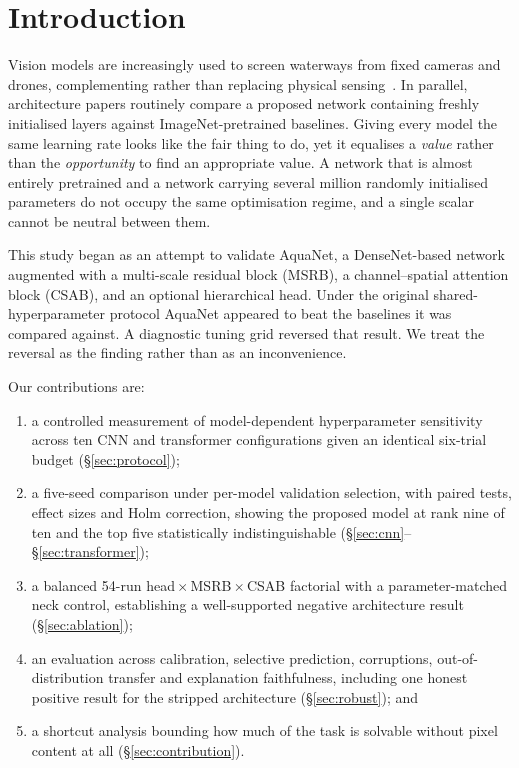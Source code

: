 \documentclass[10pt,journal]{IEEEtran}
\begin{document}
\section{Introduction}
Vision models are increasingly used to screen waterways from fixed cameras and drones,
complementing rather than replacing physical sensing~\cite{al2024drone,kim2023cctv}. In
parallel, architecture papers routinely compare a proposed network containing freshly
initialised layers against ImageNet-pretrained baselines. Giving every model the same
learning rate looks like the fair thing to do, yet it equalises a \emph{value} rather than
the \emph{opportunity} to find an appropriate value. A network that is almost entirely
pretrained and a network carrying several million randomly initialised parameters do not
occupy the same optimisation regime, and a single scalar cannot be neutral between them.

This study began as an attempt to validate AquaNet, a DenseNet-based network augmented with
a multi-scale residual block (MSRB), a channel--spatial attention block (CSAB), and an
optional hierarchical head. Under the original shared-hyperparameter protocol AquaNet
appeared to beat the baselines it was compared against. A diagnostic tuning grid reversed
that result. We treat the reversal as the finding rather than as an inconvenience.

Our contributions are:
\begin{enumerate}
\item a controlled measurement of model-dependent hyperparameter sensitivity across ten CNN
and transformer configurations given an identical six-trial budget (\S\ref{sec:protocol});
\item a five-seed comparison under per-model validation selection, with paired tests, effect
sizes and Holm correction, showing the proposed model at rank nine of ten and the top five
statistically indistinguishable (\S\ref{sec:cnn}--\S\ref{sec:transformer});
\item a balanced 54-run head\,$\times$\,MSRB\,$\times$\,CSAB factorial with a
parameter-matched neck control, establishing a well-supported negative architecture result
(\S\ref{sec:ablation});
\item an evaluation across calibration, selective prediction, corruptions, out-of-distribution
transfer and explanation faithfulness, including one honest positive result for the stripped
architecture (\S\ref{sec:robust}); and
\item a shortcut analysis bounding how much of the task is solvable without pixel content at
all (\S\ref{sec:contribution}).
\end{enumerate}
\end{document}
